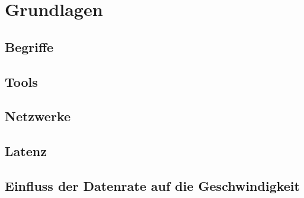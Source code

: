 \section{Grundlagen} %
\label{sec:grundlagen}

	\subsection{Begriffe}
	\label{sub:begriffe}
	

	\subsection{Tools}
	\label{sub:tools}
	

	\subsection{Netzwerke}
	\label{sub:netzwerke}
	


	\subsection{Latenz}
	\label{sub:latenz}
		

	\subsection{Einfluss der Datenrate auf die Geschwindigkeit}
	\label{sub:einfluss_der_datenrate_auf_die_geschwindigkeit}
	
	
